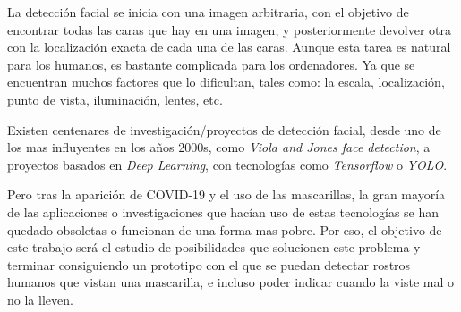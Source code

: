 La detección facial se inicia con una imagen arbitraria, con el objetivo de encontrar todas las caras que hay en una imagen, y posteriormente devolver otra con la localización exacta de cada una de las caras. Aunque esta tarea es natural para los humanos, es bastante complicada para los ordenadores. Ya que se encuentran muchos factores que lo dificultan, tales como: la escala, localización, punto de vista, iluminación, lentes, etc.

Existen centenares de investigación/proyectos de detección facial, desde uno de los mas influyentes en los años 2000s, como \textit{Viola and Jones face detection}, a proyectos basados en \textit{Deep Learning}, con tecnologías como \textit{Tensorflow} o \textit{YOLO}.

Pero tras la aparición de COVID-19 y el uso de las mascarillas, la gran mayoría de las aplicaciones o investigaciones que hacían uso de estas tecnologías se han quedado obsoletas o funcionan de una forma mas pobre. Por eso, el objetivo de este trabajo será el estudio de posibilidades que solucionen este problema y terminar consiguiendo un prototipo con el que se puedan detectar rostros humanos que vistan una mascarilla, e incluso poder indicar cuando la viste mal o no la lleven. 



